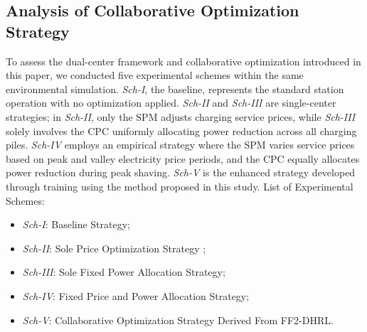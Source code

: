 \documentclass[preprint,12pt]{elsarticle}
\begin{document}
\subsection{Analysis of Collaborative Optimization Strategy}

To assess the dual-center framework and collaborative optimization introduced in this paper, we conducted five experimental schemes within the same environmental simulation.  \emph{Sch-I}, the baseline, represents the standard station operation with no optimization applied. \emph{Sch-II} and \emph{Sch-III} are single-center strategies; in \emph{Sch-II}, only the SPM adjusts charging service prices, while \emph{Sch-III} solely involves the CPC uniformly allocating power reduction across all charging piles. \emph{Sch-IV} employs an empirical strategy where the SPM varies service prices based on peak and valley electricity price periods, and the CPC equally allocates power reduction during peak shaving. \emph{Sch-V} is the enhanced strategy developed through training using the method proposed in this study. List of Experimental Schemes: 
\begin{itemize}
\item \emph{Sch-I}: Baseline Strategy;
\item \emph{Sch-\mbox{II}}: Sole Price Optimization Strategy ;
\item \emph{Sch-\mbox{III}}: Sole Fixed Power Allocation Strategy;
\item \emph{Sch-\mbox{IV}}: Fixed Price and Power Allocation Strategy;
\item \emph{Sch-\mbox{V}}: Collaborative Optimization Strategy Derived From
FF2-DHRL.
\end{itemize}
\end{document}
